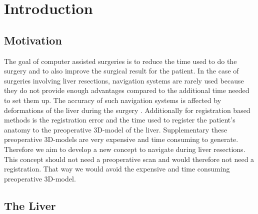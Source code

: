 %
%
%

\chapter{Introduction}
\section{Motivation} 
The goal of computer assisted surgeries is to reduce the time used to do the
surgery and to also improve the surgical result for the patient. In the case of
surgeries involving liver resections, navigation systems are rarely used because
they do not provide enough advantages compared to the additional time needed to
set them up. The accuracy of such navigation systems is affected by
deformations of the liver during the surgery \cite{clements2017deformation}.
Additionally for registration based methods is the registration error and the
time used to register the patient's anatomy to the preoperative 3D-model of the
liver. Supplementary these preoperative 3D-models are very expensive and time
consuming to generate. Therefore we aim to develop a new concept to navigate
during liver resections. This concept should not need a preoperative scan and would therefore
not need a registration. That way we would avoid the expensive and time
consuming preoperative 3D-model. 
\section{The Liver} 
